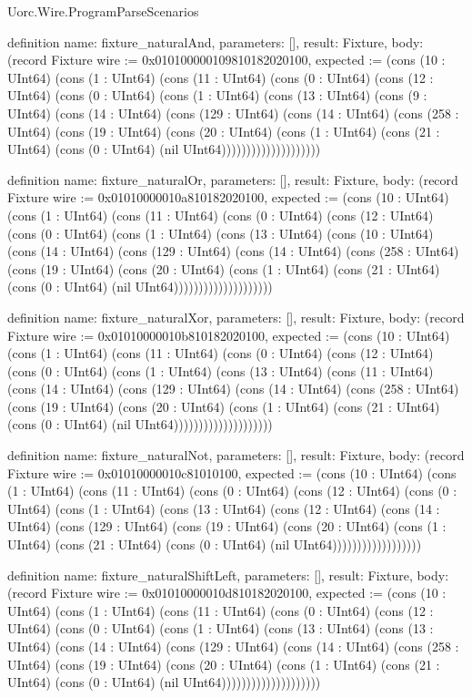 \begin{lexlean}{Uorc.Wire.ProgramParseScenarios}
\begin{semanticmodule}
definition{
  name: fixture_naturalAnd,
  parameters: [],
  result: Fixture,
  body: (record Fixture {wire := 0x010100000109810182020100, expected := (cons (10 : UInt64) (cons (1 : UInt64) (cons (11 : UInt64) (cons (0 : UInt64) (cons (12 : UInt64) (cons (0 : UInt64) (cons (1 : UInt64) (cons (13 : UInt64) (cons (9 : UInt64) (cons (14 : UInt64) (cons (129 : UInt64) (cons (14 : UInt64) (cons (258 : UInt64) (cons (19 : UInt64) (cons (20 : UInt64) (cons (1 : UInt64) (cons (21 : UInt64) (cons (0 : UInt64) (nil UInt64)))))))))))))))))))})
}

definition{
  name: fixture_naturalOr,
  parameters: [],
  result: Fixture,
  body: (record Fixture {wire := 0x01010000010a810182020100, expected := (cons (10 : UInt64) (cons (1 : UInt64) (cons (11 : UInt64) (cons (0 : UInt64) (cons (12 : UInt64) (cons (0 : UInt64) (cons (1 : UInt64) (cons (13 : UInt64) (cons (10 : UInt64) (cons (14 : UInt64) (cons (129 : UInt64) (cons (14 : UInt64) (cons (258 : UInt64) (cons (19 : UInt64) (cons (20 : UInt64) (cons (1 : UInt64) (cons (21 : UInt64) (cons (0 : UInt64) (nil UInt64)))))))))))))))))))})
}

definition{
  name: fixture_naturalXor,
  parameters: [],
  result: Fixture,
  body: (record Fixture {wire := 0x01010000010b810182020100, expected := (cons (10 : UInt64) (cons (1 : UInt64) (cons (11 : UInt64) (cons (0 : UInt64) (cons (12 : UInt64) (cons (0 : UInt64) (cons (1 : UInt64) (cons (13 : UInt64) (cons (11 : UInt64) (cons (14 : UInt64) (cons (129 : UInt64) (cons (14 : UInt64) (cons (258 : UInt64) (cons (19 : UInt64) (cons (20 : UInt64) (cons (1 : UInt64) (cons (21 : UInt64) (cons (0 : UInt64) (nil UInt64)))))))))))))))))))})
}

definition{
  name: fixture_naturalNot,
  parameters: [],
  result: Fixture,
  body: (record Fixture {wire := 0x01010000010c81010100, expected := (cons (10 : UInt64) (cons (1 : UInt64) (cons (11 : UInt64) (cons (0 : UInt64) (cons (12 : UInt64) (cons (0 : UInt64) (cons (1 : UInt64) (cons (13 : UInt64) (cons (12 : UInt64) (cons (14 : UInt64) (cons (129 : UInt64) (cons (19 : UInt64) (cons (20 : UInt64) (cons (1 : UInt64) (cons (21 : UInt64) (cons (0 : UInt64) (nil UInt64)))))))))))))))))})
}

definition{
  name: fixture_naturalShiftLeft,
  parameters: [],
  result: Fixture,
  body: (record Fixture {wire := 0x01010000010d810182020100, expected := (cons (10 : UInt64) (cons (1 : UInt64) (cons (11 : UInt64) (cons (0 : UInt64) (cons (12 : UInt64) (cons (0 : UInt64) (cons (1 : UInt64) (cons (13 : UInt64) (cons (13 : UInt64) (cons (14 : UInt64) (cons (129 : UInt64) (cons (14 : UInt64) (cons (258 : UInt64) (cons (19 : UInt64) (cons (20 : UInt64) (cons (1 : UInt64) (cons (21 : UInt64) (cons (0 : UInt64) (nil UInt64)))))))))))))))))))})
}


\end{semanticmodule}
\end{lexlean}
